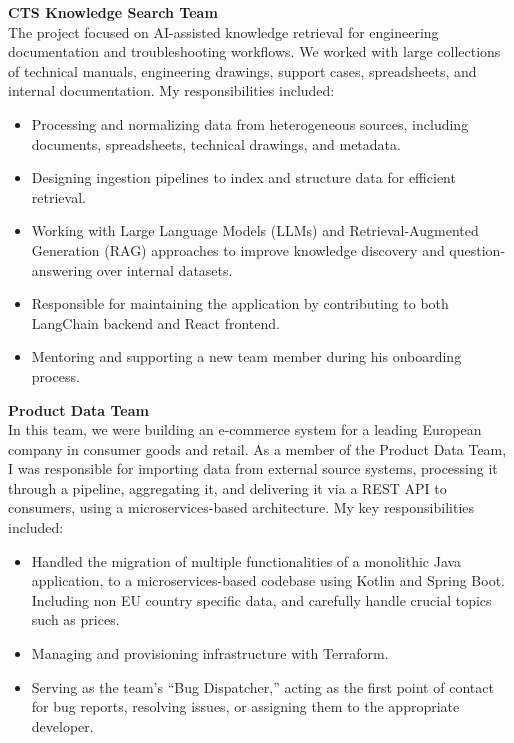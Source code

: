 \documentclass[10pt,a4paper]{article}
\newenvironment{cvBlock}{%
  \begin{list}{}{%
    \setlength{\leftmargin}{0.58cm}%
    \setlength{\rightmargin}{0.14cm}%
    \setlength{\topsep}{0pt}%
    \setlength{\partopsep}{0pt}%
    \setlength{\parsep}{0pt}%
    \setlength{\itemsep}{0pt}%
  }%
  \item[]%
}{%
  \end{list}%
}
\begin{document}
\begin{cvBlock}
  \vspace{0.12cm}
  \textbf{CTS Knowledge Search Team}\\
  The project focused on AI-assisted knowledge retrieval for engineering documentation and troubleshooting workflows. We worked with large collections of technical manuals, engineering drawings, support cases, spreadsheets, and internal documentation. My responsibilities included:
  \begin{itemize}[leftmargin=0.9cm,itemsep=0pt,topsep=0.04cm]
    \item Processing and normalizing data from heterogeneous sources, including documents, spreadsheets, technical drawings, and metadata.
    \item Designing ingestion pipelines to index and structure data for efficient retrieval.
    \item Working with Large Language Models (LLMs) and Retrieval-Augmented Generation (RAG) approaches to improve knowledge discovery and question-answering over internal datasets.
    \item Responsible for maintaining the application by contributing to both LangChain backend and React frontend.
    \item Mentoring and supporting a new team member during his onboarding process.
  \end{itemize}
  \vspace{0.12cm}

  \textbf{Product Data Team}\\
  In this team, we were building an e-commerce system for a leading European company in consumer goods and retail. As a member of the Product Data Team, I was responsible for importing data from external source systems, processing it through a pipeline, aggregating it, and delivering it via a REST API to consumers, using a microservices-based architecture. My key responsibilities included:
  \begin{itemize}[leftmargin=0.9cm,itemsep=0pt,topsep=0.04cm]
    \item Handled the migration of multiple functionalities of a monolithic Java application, to a microservices-based codebase using Kotlin and Spring Boot. Including non EU country specific data, and carefully handle crucial topics such as prices.
    \item Managing and provisioning infrastructure with Terraform.
    \item Serving as the team's ``Bug Dispatcher,'' acting as the first point of contact for bug reports, resolving issues, or assigning them to the appropriate developer.
  \end{itemize}


\end{cvBlock}
\end{document}
